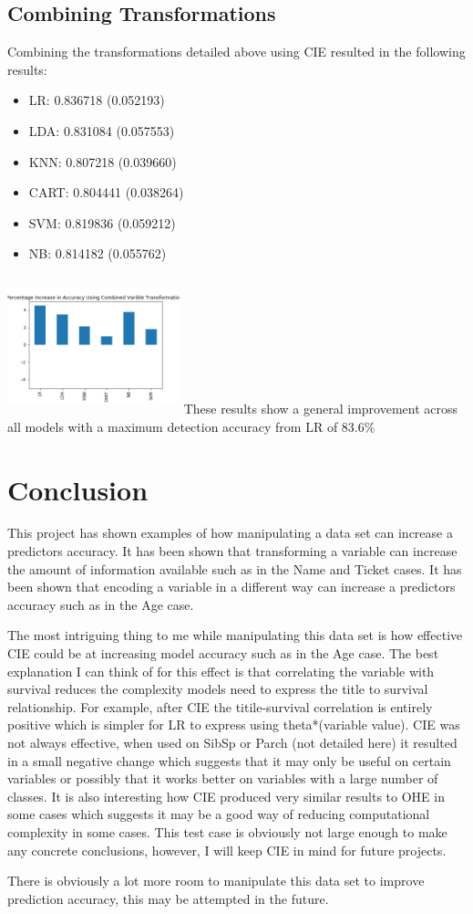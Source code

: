 \documentclass{article}
\begin{document}
\subsection{Combining Transformations}
Combining the transformations detailed above using CIE resulted in the following results:

\begin{itemize}
\item LR: 0.836718 (0.052193)
\item LDA: 0.831084 (0.057553)
\item KNN: 0.807218 (0.039660)
\item CART: 0.804441 (0.038264)
\item SVM: 0.819836 (0.059212)
\item NB: 0.814182 (0.055762)
\end{itemize}
\par
\includegraphics[width=5cm, height=4cm]{Percentage_Increase_in_Accuracy_Using_Combined_Varible_Transformations}
These results show a general improvement across all models with a maximum detection accuracy from LR of 83.6\%

\section{Conclusion}
This project has shown examples of how manipulating a data set can increase a predictors accuracy. It has been shown that transforming a variable can increase the amount of information available such as in the Name and Ticket cases. It has been shown that encoding a variable in a different way can increase a predictors accuracy such as in the Age case.
\par
The most intriguing thing to me while manipulating this data set is how effective CIE could be at increasing model accuracy such as in the Age case. The best explanation I can think of for this effect is that correlating the variable with survival reduces the complexity models need to express the title to survival relationship. For example, after CIE the titile-survival correlation is entirely positive which is simpler for LR to express using theta*(variable value). CIE was not always effective, when used on SibSp or Parch (not detailed here) it resulted in a small negative change which suggests that it may only be useful on certain variables or possibly that it works better on variables with a large number of classes. It is also interesting how CIE produced very similar results to OHE in some cases which suggests it may be a good way of reducing computational complexity in some cases. This test case is obviously not large enough to make any concrete conclusions, however, I will keep CIE in mind for future projects.
\par
There is obviously a lot more room to manipulate this data set to improve prediction accuracy, this may be attempted in the future.
\end{document}
